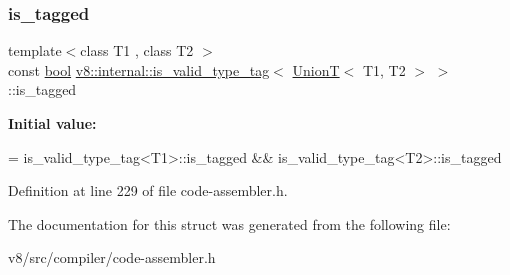\subsubsection{\texorpdfstring{is\+\_\+tagged}{is\_tagged}}
{\footnotesize\ttfamily template$<$class T1 , class T2 $>$ \\
const \mbox{\hyperlink{classbool}{bool}} \mbox{\hyperlink{structv8_1_1internal_1_1is__valid__type__tag}{v8\+::internal\+::is\+\_\+valid\+\_\+type\+\_\+tag}}$<$ \mbox{\hyperlink{structv8_1_1internal_1_1UnionT}{UnionT}}$<$ T1, T2 $>$ $>$\+::is\+\_\+tagged\hspace{0.3cm}{\ttfamily [static]}}

{\bfseries Initial value\+:}
\begin{DoxyCode}
=
      is\_valid\_type\_tag<T1>::is\_tagged && is\_valid\_type\_tag<T2>::is\_tagged
\end{DoxyCode}


Definition at line 229 of file code-\/assembler.\+h.



The documentation for this struct was generated from the following file\+:\begin{DoxyCompactItemize}
\item 
v8/src/compiler/code-\/assembler.\+h\end{DoxyCompactItemize}
